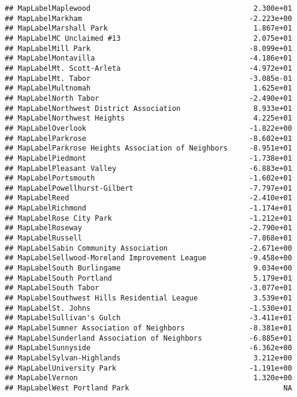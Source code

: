 \documentclass[]{article}
\begin{document}
\begin{verbatim}
## MapLabelMaplewood                                      2.300e+01
## MapLabelMarkham                                       -2.223e+00
## MapLabelMarshall Park                                  1.867e+01
## MapLabelMC Unclaimed #13                               2.075e+01
## MapLabelMill Park                                     -8.099e+01
## MapLabelMontavilla                                    -4.186e+01
## MapLabelMt. Scott-Arleta                              -4.972e+01
## MapLabelMt. Tabor                                     -3.085e-01
## MapLabelMultnomah                                      1.625e+01
## MapLabelNorth Tabor                                   -2.490e+01
## MapLabelNorthwest District Association                 8.933e+01
## MapLabelNorthwest Heights                              4.225e+01
## MapLabelOverlook                                      -1.822e+00
## MapLabelParkrose                                      -8.602e+01
## MapLabelParkrose Heights Association of Neighbors     -8.951e+01
## MapLabelPiedmont                                      -1.738e+01
## MapLabelPleasant Valley                               -6.883e+01
## MapLabelPortsmouth                                    -1.602e+01
## MapLabelPowellhurst-Gilbert                           -7.797e+01
## MapLabelReed                                          -2.410e+01
## MapLabelRichmond                                      -1.174e+01
## MapLabelRose City Park                                -1.212e+01
## MapLabelRoseway                                       -2.790e+01
## MapLabelRussell                                       -7.868e+01
## MapLabelSabin Community Association                   -2.671e+00
## MapLabelSellwood-Moreland Improvement League          -9.458e+00
## MapLabelSouth Burlingame                               9.034e+00
## MapLabelSouth Portland                                 5.179e+01
## MapLabelSouth Tabor                                   -3.077e+01
## MapLabelSouthwest Hills Residential League             3.539e+01
## MapLabelSt. Johns                                     -1.530e+01
## MapLabelSullivan's Gulch                              -3.411e+01
## MapLabelSumner Association of Neighbors               -8.381e+01
## MapLabelSunderland Association of Neighbors           -6.885e+01
## MapLabelSunnyside                                     -6.362e+00
## MapLabelSylvan-Highlands                               3.212e+00
## MapLabelUniversity Park                               -1.191e+00
## MapLabelVernon                                         1.320e+00
## MapLabelWest Portland Park                                    NA

\end{verbatim}
\end{document}
